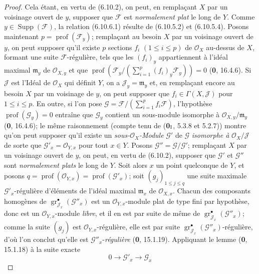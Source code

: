 \begin{proof}
Cela étant, en vertu de (6.10.2), on peut, en remplaçant $X$ par un
voisinage ouvert de $y$, supposer que $\mathcal F$ est \emph{normalement plat} le
long de $Y$. Comme $y\in\operatorname{Supp}(\mathcal F)$, la relation
(6.10.6.1) résulte de (6.10.5.2) et (6.10.5.4). Posons maintenant
$p=\operatorname{prof}(\mathcal F_y)$; remplaçant au besoin $X$ par un
voisinage ouvert de $y$, on peut supposer qu'il existe $p$ sections $f_i$
$(1\leq i\leq p)$ de $\mathcal O_X$ au-dessus de $X$, formant une suite
$\mathcal F$-régulière, tels que les $(f_i)_y$ appartiennent à l'idéal
maximal $\mathfrak m_y$ de $\mathcal O_{X,y}$ et que
$\operatorname{prof}(\mathcal F_y/(\sum_{i=1}^{p}(f_i)_y\mathcal F_y))=0$
(\textbf{0}, 16.4.6). Si $\mathcal J$ est l'Idéal de $\mathcal O_X$ qui définit
$Y$, on a $\mathcal J_y=\mathfrak m_y$ et, en remplaçant encore au besoin $X$
par un voisinage de $y$, on peut supposer que
$f_i\in\Gamma(X,\mathcal J)$ pour $1\leq i\leq p$. En outre, si l'on pose
$\mathcal G=\mathcal F/(\sum_{i=1}^{p}f_i\mathcal F)$, l'hypothèse
$\operatorname{prof}(\mathcal G_y)=0$ entraîne que $\mathcal G_y$ contient
un sous-module isomorphe à
$\mathcal O_{X,y}/\mathfrak m_y$ (\textbf{0}, 16.4.6); le même raisonnement (compte
tenu de (\textbf{0}$_{\rm I}$, 5.3.8 et 5.2.7)) montre qu'on peut supposer qu'il
existe un \emph{sous-$\mathcal O_X$-Module} $\mathcal G'$ de $\mathcal G$
\emph{isomorphe à} $\mathcal O_X/\mathcal J$ de sorte que
$\mathcal G'_x=\mathcal O_{Y,x}$ pour tout $x\in Y$. Posons
$\mathcal G''=\mathcal G/\mathcal G'$; remplaçant $X$ par un voisinage
ouvert de $y$, on peut, en vertu de (6.10.2), supposer que $\mathcal G'$ et
$\mathcal G''$ sont \emph{normalement plats} le long de $Y$. Soit alors $x$ un
point quelconque de $Y$, et posons
$q=\operatorname{prof}(\mathcal O_{Y,x})=\operatorname{prof}(\mathcal G'_x)$;
soit $(g_j)_{1\leq j\leq q}$ une suite maximale
$\mathcal G'_x$-régulière d'éléments de l'idéal maximal
$\mathfrak m_x$ de $\mathcal O_{X,x}$. Chacun des composants homogènes de
$\operatorname{gr}_{\mathcal J_x}^{\bullet}(\mathcal G''_x)$ est un
$\mathcal O_{Y,x}$-module plat de type fini par hypothèse, donc est un
$\mathcal O_{Y,x}$-module \emph{libre}, et il en est par suite de même de
$\operatorname{gr}_{\mathcal J_x}^{\bullet}(\mathcal G''_x)$; comme la
suite $(g_j)$ est $\mathcal O_{Y,x}$-régulière, elle est par suite
$\operatorname{gr}_{\mathcal J_x}^{\bullet}(\mathcal G''_x)$-régulière,
d'où l'on conclut qu'elle est $\mathcal G''_x$-\emph{régulière} (\textbf{0}, 15.1.19).
Appliquant le lemme (\textbf{0}, 15.1.18) à la suite exacte
\[
0\longrightarrow\mathcal G'_x\longrightarrow\mathcal G_x
\]
\end{proof}
